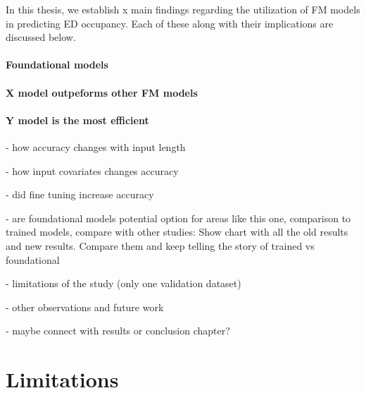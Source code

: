 In this thesis, we establish x main findings regarding the utilization of FM models in predicting ED occupancy. Each of these along with their implications are discussed below.

\paragraph{Foundational models}

\paragraph{X model outpeforms other FM models}

\paragraph{Y model is the most efficient}

- how accuracy changes with input length

- how input covariates changes accuracy

- did fine tuning increase accuracy

- are foundational models potential option for areas like this one, comparison to trained models, compare with other studies:
Show chart with all the old results and new results. Compare them and keep telling the story of trained vs foundational

- limitations of the study (only one validation dataset)

- other observations and future work

- maybe connect with results or conclusion chapter?

\section{Limitations}